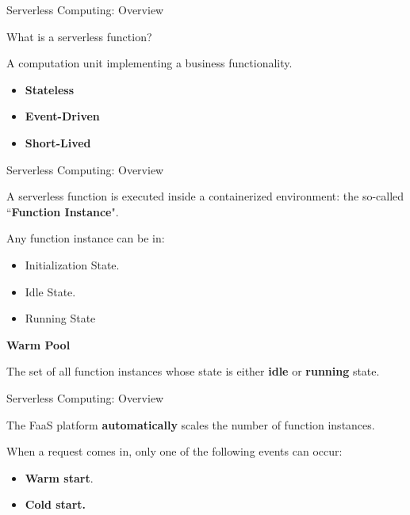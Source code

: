 \documentclass[13.5pt]{beamer}
\newcommand{\B}[1]{\textcolor{TorVergataColor}{\textbf{#1}}}
\begin{document}
\begin{frame}{Serverless Computing: Overview}
	
	\begin{block}{}
		\centering
		What is a serverless function?
	\end{block}
	\vspace{\baselineskip}
	A computation unit implementing a business functionality.
	
	\begin{itemize}
		\item \B{Stateless}
		\item \B{Event-Driven}
		\item \B{Short-Lived}
	\end{itemize}

\end{frame} 
\begin{frame}{Serverless Computing: Overview}
	
	\begin{block}{}
		\centering
		A serverless function is executed inside a containerized environment: the so-called ``\B{Function Instance}".
	\end{block}
	\vspace{\baselineskip}
	Any function instance can be in:
	\begin{itemize}
		\item Initialization State.
		\item Idle State.
		\item Running State
	\end{itemize}
	\vspace{\baselineskip}
	\begin{block}{\textbf{Warm Pool}}
		
		The set of all function instances whose state is either \B{idle} or \B{running} state.
	\end{block}
	
	
	
\end{frame} 
\begin{frame}{Serverless Computing: Overview}
	
\begin{block}{}
	\centering
	The FaaS platform \B{automatically} scales the number of function instances.
\end{block}

\vspace{\baselineskip}
When a request comes in, only one of the following events can occur:
\begin{itemize}
	\item \textbf{Warm start}.
	\item \textbf{Cold start.}
\end{itemize}

		
\end{frame} 
\end{document}

